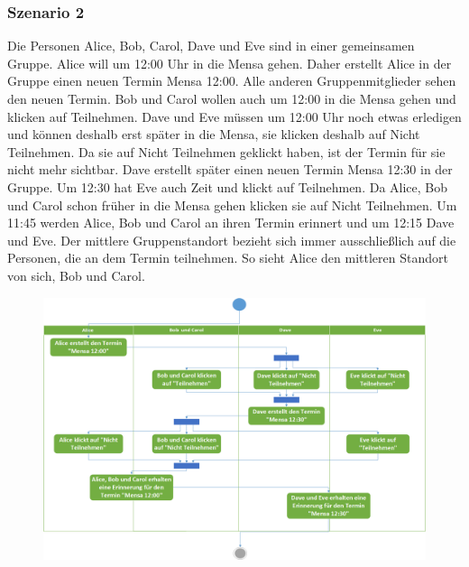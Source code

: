 \documentclass{scrartcl}
\begin{document}
	\newpage
	
	
	\subsubsection{Szenario 2}
	Die Personen Alice, Bob, Carol, Dave und Eve sind in einer gemeinsamen Gruppe.
	Alice will um 12:00 Uhr in die Mensa gehen. Daher erstellt Alice in der Gruppe einen neuen Termin \glqq{}Mensa 12:00\grqq{}.
	Alle anderen Gruppenmitglieder sehen den neuen Termin. Bob und Carol wollen auch um 12:00 in die Mensa gehen und klicken auf \glqq{}Teilnehmen\grqq{}.
	Dave und Eve müssen um 12:00 Uhr noch etwas erledigen und können deshalb erst später in die Mensa, sie klicken deshalb auf \glqq{}Nicht Teilnehmen\grqq{}.
	Da sie auf \glqq{}Nicht Teilnehmen\grqq{} geklickt haben, ist der Termin für sie nicht mehr sichtbar.
	Dave erstellt später einen neuen Termin \glqq{}Mensa 12:30\grqq{} in der Gruppe.
	Um 12:30 hat Eve auch Zeit und klickt auf \glqq{}Teilnehmen\grqq{}.
	Da Alice, Bob und Carol schon früher in die Mensa gehen klicken sie auf \glqq{}Nicht Teilnehmen\grqq{}.
	Um 11:45 werden Alice, Bob und Carol an ihren Termin erinnert und um 12:15 Dave und Eve.
	Der mittlere Gruppenstandort bezieht sich immer ausschließlich auf die Personen, die an dem Termin teilnehmen.
	So sieht Alice den mittleren Standort von sich, Bob und Carol.	
	\newline
	\newline
	\newline
	\begin{figure}[h]
		\includegraphics[width=\textwidth]{Szenario2}
	\end{figure}
	\newpage
	
\end{document}
